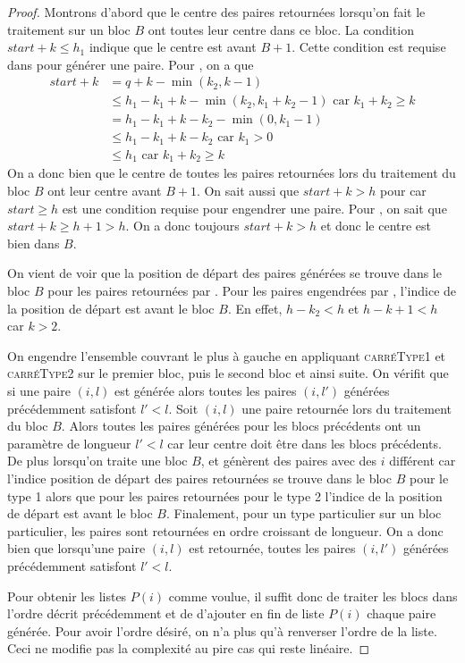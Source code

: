 \documentclass[10pt,letterpaper,oneside]{article}
\begin{document}
\begin{proof}
    Montrons d'abord que le centre des paires retournées lorsqu'on fait le traitement sur un bloc $B$ ont toutes leur centre dans ce bloc. La condition $start+k\leq h_1$ indique que le centre est avant $B+1$. Cette condition est requise dans  pour générer une paire. Pour , on a que
    \begin{align*}
        start+k&=q+k-\min(k_2,k-1)\\
        &\leq h_1-k_1+k-\min(k_2,k_1+k_2-1) \text{ car $k_1+k_2\geq k$} \\
        &=h_1-k_1+k-k_2-\min(0,k_1-1) \\
        &\leq h_1-k_1+k-k_2 \text{ car $k_1>0$} \\
        &\leq h_1 \text{ car $k_1+k_2\geq k$}
    \end{align*}
    On a donc bien que le centre de toutes les paires retournées lors du traitement du bloc $B$ ont leur centre avant $B+1$. On sait aussi que $start+k>h$ pour  car $start\geq h$ est une condition requise pour engendrer une paire. Pour , on sait que $start+k\geq h+1>h$. On a donc toujours $start+k>h$ et donc le centre est bien dans $B$.
    
    On vient de voir que la position de départ des paires générées se trouve dans le bloc $B$ pour les paires retournées par . Pour les paires engendrées par , l'indice de la position de départ est avant le bloc $B$. En effet, $h-k_2<h$ et $h-k+1<h$ car $k>2$.
    
    On engendre l'ensemble couvrant le plus à gauche en appliquant \textsc{carréType1} et  \textsc{carréType2} sur le premier bloc, puis le second bloc et ainsi suite. On vérifit que si une paire $(i,l)$ est générée alors toutes les paires $(i,l')$ générées précédemment satisfont $l'<l$. Soit $(i,l)$ une paire retournée lors du traitement du bloc $B$. Alors toutes les paires générées pour les blocs précédents ont un paramètre de longueur $l'<l$ car leur centre doit être dans les blocs précédents. De plus lorsqu'on traite une bloc $B$,  et  génèrent des paires avec des $i$ différent car l'indice position de départ des paires retournées se trouve dans le bloc $B$ pour le type 1 alors que pour les paires retournées pour le type 2 l'indice de la position de départ est avant le bloc $B$. Finalement, pour un type particulier sur un bloc particulier, les paires sont retournées en ordre croissant de longueur. On a donc bien que lorsqu'une paire $(i,l)$ est retournée, toutes les paires $(i,l')$ générées précédemment satisfont $l'<l$.
    
    Pour obtenir les listes $P(i)$ comme voulue, il suffit donc de traiter les blocs dans l'ordre décrit précédemment et de d'ajouter en fin de liste $P(i)$ chaque paire générée. Pour avoir l'ordre désiré, on n'a plus qu'à renverser l'ordre de la liste. Ceci ne modifie pas la complexité au pire cas qui reste linéaire.
\end{proof}
\end{document}
